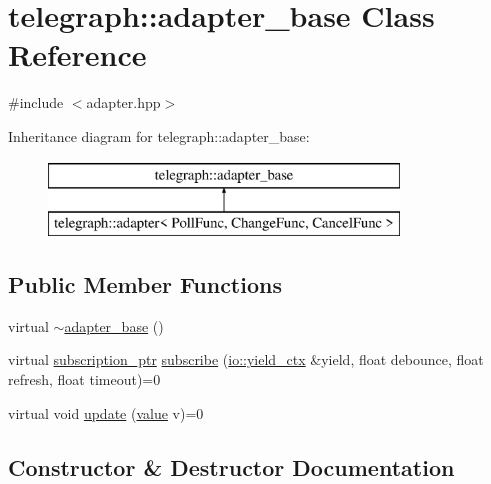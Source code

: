 \hypertarget{classtelegraph_1_1adapter__base}{}\section{telegraph\+:\+:adapter\+\_\+base Class Reference}
\label{classtelegraph_1_1adapter__base}


{\ttfamily \#include $<$adapter.\+hpp$>$}

Inheritance diagram for telegraph\+:\+:adapter\+\_\+base\+:\begin{figure}[H]
\begin{center}
\leavevmode
\includegraphics[height=2.000000cm]{classtelegraph_1_1adapter__base}
\end{center}
\end{figure}
\subsection*{Public Member Functions}
\begin{DoxyCompactItemize}
\item 
virtual \hyperlink{classtelegraph_1_1adapter__base_a385f1cf5e39a3cbd2c3f030caeb15451}{$\sim$adapter\+\_\+base} ()
\item 
virtual \hyperlink{namespacetelegraph_a58641aa5b1a2cbdb0431916a87069f64}{subscription\+\_\+ptr} \hyperlink{classtelegraph_1_1adapter__base_a2fa110e124bc9a86c9433fe04033ff06}{subscribe} (\hyperlink{structboost_1_1asio_1_1yield__ctx}{io\+::yield\+\_\+ctx} \&yield, float debounce, float refresh, float timeout)=0
\item 
virtual void \hyperlink{classtelegraph_1_1adapter__base_a3b2347f991a3c621b35f20f81419cf62}{update} (\hyperlink{classtelegraph_1_1value}{value} v)=0
\end{DoxyCompactItemize}


\subsection{Constructor \& Destructor Documentation}
\mbox{\label{classtelegraph_1_1adapter__base_a385f1cf5e39a3cbd2c3f030caeb15451}} 
